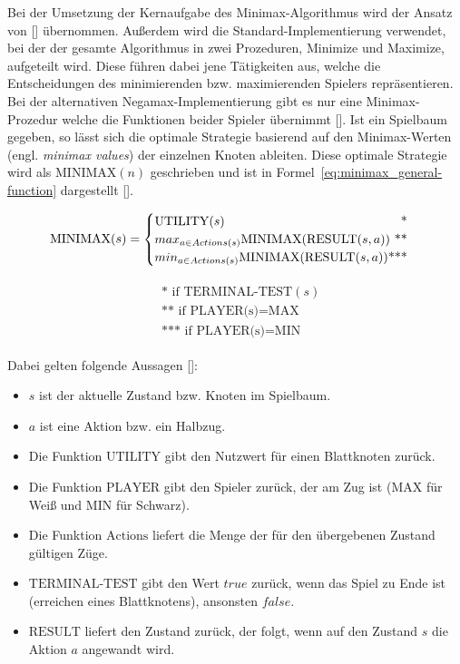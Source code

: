 Bei der Umsetzung der Kernaufgabe des Minimax-Algorithmus wird der Ansatz von [\cite{Knuth1975}] übernommen.
Außerdem wird die Standard-Implementierung verwendet, bei der der gesamte Algorithmus in zwei Prozeduren, Minimize und  Maximize, aufgeteilt wird.
Diese führen dabei jene Tätigkeiten aus, welche die Entscheidungen des minimierenden bzw. maximierenden Spielers repräsentieren.
Bei der alternativen Negamax-Implementierung gibt es nur eine Minimax-Prozedur welche die Funktionen beider Spieler übernimmt [\cite{Wikipedia2020}].
Ist ein Spielbaum gegeben, so lässt sich die optimale Strategie basierend auf den Minimax-Werten (engl. \textit{minimax values}) der einzelnen Knoten ableiten.
Diese optimale Strategie wird als $\text{MINIMAX}(n)$ geschrieben und ist in Formel~\ref{eq:minimax_general-function} dargestellt [\cite{Russell2010}].

\begin{equation} \label{eq:minimax_general-function}
    \text{MINIMAX}(s) =
    \begin{cases}
        \text{UTILITY}(s) \hfill \text{*} \\
        max_{a \in Actions(s)} \text{MINIMAX}(\text{RESULT}(s, a)) \hfill \text{**} \\
        min_{a \in Actions(s)} \text{MINIMAX}(\text{RESULT}(s, a)) \hfill \text{***} \\
    \end{cases}
\end{equation}

\begin{align*}
    \begin{split}
        & \text{*\ \ \ \ if TERMINAL-TEST}(s) \\
        & \text{**\ \ \ if PLAYER(s)} = \text{MAX} \\
        & \text{***\ \ if PLAYER(s)} = \text{MIN}
    \end{split}
\end{align*}

Dabei gelten folgende Aussagen [\cite{Russell2010}]:

\begin{itemize}
    \item $s$ ist der aktuelle Zustand bzw. Knoten im Spielbaum.
    \item $a$ ist eine Aktion bzw. ein Halbzug.
    \item Die Funktion $\text{UTILITY}$ gibt den Nutzwert für einen Blattknoten zurück.
    \item Die Funktion $\text{PLAYER}$ gibt den Spieler zurück, der am Zug ist ($\text{MAX}$ für Weiß und $\text{MIN}$ für Schwarz).
    \item Die Funktion $\text{Actions}$ liefert die Menge der für den übergebenen Zustand gültigen Züge.
    \item $\text{TERMINAL-TEST}$ gibt den Wert $true$ zurück, wenn das Spiel zu Ende ist (erreichen eines Blattknotens), ansonsten $false$.
    \item $\text{RESULT}$ liefert den Zustand zurück, der folgt, wenn auf den Zustand $s$ die Aktion $a$ angewandt wird.
\end{itemize}

